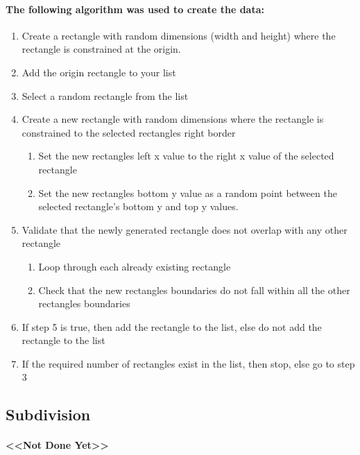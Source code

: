\documentclass{Assignment}
\begin{document}
            \paragraph{The following algorithm was used to create the data:}
            \begin{enumerate}
                \item Create a rectangle with random dimensions (width and height) where the rectangle is constrained at the origin.
                \item Add the origin rectangle to your list
                \item Select a random rectangle from the list
                \item Create a new rectangle with random dimensions where the rectangle is constrained to the selected rectangles right border
                    \begin{enumerate}
                        \item Set the new rectangles left x value to the right x value of the selected rectangle
                        \item Set the new rectangles bottom y value as a random point between the selected rectangle's bottom y and top y values.
                    \end{enumerate}
                \item Validate that the newly generated rectangle does not overlap with any other rectangle
                    \begin{enumerate}
                        \item Loop through each already existing rectangle
                        \item Check that the new rectangles boundaries do not fall within all the other rectangles boundaries
                    \end{enumerate}
                \item If step 5 is true, then add the rectangle to the list, else do not add the rectangle to the list
                \item If the required number of rectangles exist in the list, then stop, else go to step 3
            \end{enumerate}
                
        \subsection{Subdivision}
            \paragraph{
                <<Not Done Yet>>
            }
    
\end{document}
